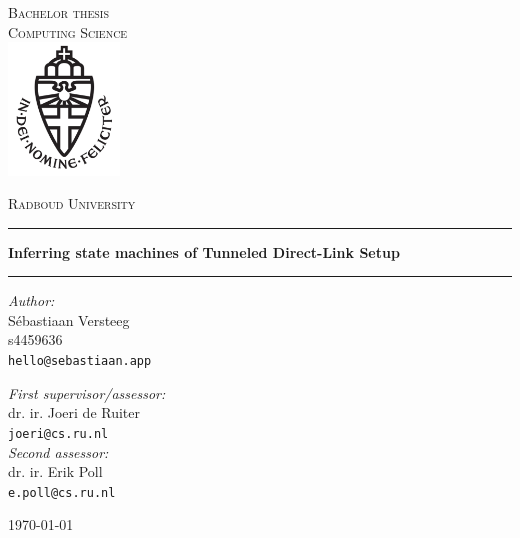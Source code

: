\documentclass[11pt,a4paper]{report}
\begin{document}
\begin{titlepage}
\begin{center}
\textsc{\LARGE Bachelor thesis\\Computing Science}\\[1.5cm]
\includegraphics[height=100pt]{logo}

\vspace{0.4cm}
\textsc{\Large Radboud University}\\[1cm]
\hrule
\vspace{0.4cm}
\textbf{\huge Inferring state machines of Tunneled Direct-Link Setup}\\[0.4cm]
\hrule
\vspace{2cm}
\begin{minipage}[t]{0.45\textwidth}
\begin{flushleft} \large
\textit{Author:}\\
S\'ebastiaan Versteeg\\
s4459636\\
\texttt{hello@sebastiaan.app}\\
\end{flushleft}
\end{minipage}
\begin{minipage}[t]{0.45\textwidth}
\begin{flushright} \large
\textit{First supervisor/assessor:}\\
dr. ir. Joeri de Ruiter\\
\texttt{joeri@cs.ru.nl}\\[1.3cm]
\textit{Second assessor:}\\
dr. ir. Erik Poll\\
\texttt{e.poll@cs.ru.nl}
\end{flushright}
\end{minipage}
\vfill
{\large \today}
\end{center}
\end{titlepage}



\tableofcontents











\begin{appendices}

\end{appendices}
\end{document}
